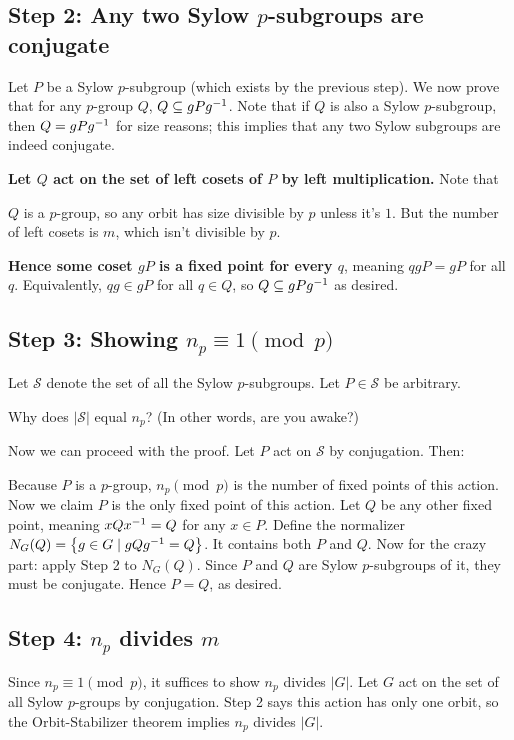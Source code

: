 \subsection{Step 2: Any two Sylow $p$-subgroups are conjugate}
Let $P$ be a Sylow $p$-subgroup (which exists by the previous step).
We now prove that for any $p$-group $Q$, $Q \subseteq gPg^{-1}$.
Note that if $Q$ is also a Sylow $p$-subgroup, then $Q = gPg^{-1}$ for size reasons;
this implies that any two Sylow subgroups are indeed conjugate.

\textbf{Let $Q$ act on the set of left cosets of $P$ by left multiplication.}
Note that
\begin{itemize}
	\ii $Q$ is a $p$-group, so any orbit has size divisible by $p$ unless it's $1$.
	\ii But the number of left cosets is $m$, which isn't divisible by $p$.
\end{itemize}
\textbf{Hence some coset $gP$ is a fixed point for every $q$}, meaning
$qgP = gP$ for all $q$.
Equivalently, $qg \in gP$ for all $q \in Q$, so $Q \subseteq gPg^{-1}$ as desired.


\subsection{Step 3: Showing $n_p \equiv 1 \pmod p$}
Let $\mathcal S$ denote the set of all the Sylow $p$-subgroups.
Let $P \in \mathcal S$ be arbitrary.
\begin{ques}
	Why does $\left\lvert \mathcal S \right\rvert$ equal $n_p$?
	(In other words, are you awake?)
\end{ques}
Now we can proceed with the proof.
Let $P$ act on $\mathcal S$ by conjugation.
Then:
\begin{itemize}
	\ii Because $P$ is a $p$-group, $n_p \pmod p$ is the number of fixed points
	of this action.
	Now we claim $P$ is the only fixed point of this action.
	\ii Let $Q$ be any other fixed point, meaning $xQx^{-1} = Q$ for any $x \in P$.
	\ii Define the normalizer $N_G(Q) = \left\{ g \in G \mid gQg^{-1} = Q \right\}$.  It contains both $P$ and $Q$.
	\ii Now for the crazy part: apply Step 2 to $N_G(Q)$.
	Since $P$ and $Q$ are Sylow $p$-subgroups of it, they must be conjugate.
	\ii Hence $P=Q$, as desired.
\end{itemize}

\subsection{Step 4: $n_p$ divides $m$}
Since $n_p \equiv 1 \pmod p$, it suffices to show $n_p$ divides $\left\lvert G \right\rvert$.
Let $G$ act on the set of all Sylow $p$-groups by conjugation.
Step 2 says this action has only one orbit, so the Orbit-Stabilizer theorem
implies $n_p$ divides $\left\lvert G \right\rvert$.


